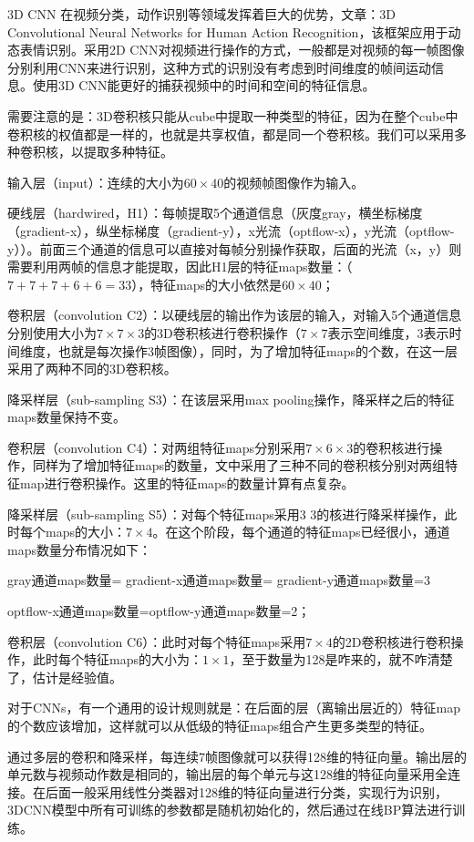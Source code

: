 3D CNN 在视频分类，动作识别等领域发挥着巨大的优势，文章：3D Convolutional Neural Networks for Human Action Recognition，该框架应用于动态表情识别。采用2D CNN对视频进行操作的方式，一般都是对视频的每一帧图像分别利用CNN来进行识别，这种方式的识别没有考虑到时间维度的帧间运动信息。使用3D CNN能更好的捕获视频中的时间和空间的特征信息。

需要注意的是：3D卷积核只能从cube中提取一种类型的特征，因为在整个cube中卷积核的权值都是一样的，也就是共享权值，都是同一个卷积核。我们可以采用多种卷积核，以提取多种特征。

输入层（input）：连续的大小为$60\times40$的视频帧图像作为输入。

硬线层（hardwired，H1）：每帧提取5个通道信息（灰度gray，横坐标梯度（gradient-x），纵坐标梯度（gradient-y），x光流（optflow-x），y光流（optflow-y））。前面三个通道的信息可以直接对每帧分别操作获取，后面的光流（x，y）则需要利用两帧的信息才能提取，因此H1层的特征maps数量：（$7+7+7+6+6=33$），特征maps的大小依然是$60\times40$；

卷积层（convolution C2）：以硬线层的输出作为该层的输入，对输入5个通道信息分别使用大小为$7\times7\times3$的3D卷积核进行卷积操作（$7\times7$表示空间维度，3表示时间维度，也就是每次操作3帧图像），同时，为了增加特征maps的个数，在这一层采用了两种不同的3D卷积核。

降采样层（sub-sampling S3）：在该层采用max pooling操作，降采样之后的特征maps数量保持不变。

卷积层（convolution C4）：对两组特征maps分别采用$7\times6\times3$的卷积核进行操作，同样为了增加特征maps的数量，文中采用了三种不同的卷积核分别对两组特征map进行卷积操作。这里的特征maps的数量计算有点复杂。

降采样层（sub-sampling S5）：对每个特征maps采用3 3的核进行降采样操作，此时每个maps的大小：$7\times4$。在这个阶段，每个通道的特征maps已经很小，通道maps数量分布情况如下：

gray通道maps数量= gradient-x通道maps数量= gradient-y通道maps数量=3

optflow-x通道maps数量=optflow-y通道maps数量=2；

卷积层（convolution C6）：此时对每个特征maps采用$7\times4$的2D卷积核进行卷积操作，此时每个特征maps的大小为：$1\times1$，至于数量为128是咋来的，就不咋清楚了，估计是经验值。

对于CNNs，有一个通用的设计规则就是：在后面的层（离输出层近的）特征map的个数应该增加，这样就可以从低级的特征maps组合产生更多类型的特征。

通过多层的卷积和降采样，每连续7帧图像就可以获得128维的特征向量。输出层的单元数与视频动作数是相同的，输出层的每个单元与这128维的特征向量采用全连接。在后面一般采用线性分类器对128维的特征向量进行分类，实现行为识别，3DCNN模型中所有可训练的参数都是随机初始化的，然后通过在线BP算法进行训练。


